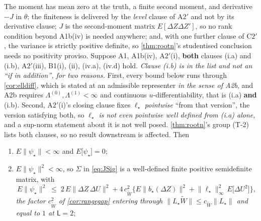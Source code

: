 \begin{lemma}[{The moment is valid, its variance is finite, its $\theta$-Jacobian is $-J$, and $J=E[\Delta Z\Delta Z']$}]\label{lem:momzero}
The moment has mean zero at the truth, a finite second moment, and derivative $-J$ in $\theta$; the
finiteness is delivered by the \emph{level} clause of A$2'$ and not by its derivative clause; $J$ is
the second-moment matrix $E[\Delta Z\Delta Z']$, so no rank condition beyond A1b(iv) is needed anywhere;
and, with one further clause of C$2'$, the variance is strictly positive definite, so \cref{thm:rootn}'s
studentised conclusion needs no positivity proviso.
Suppose A1, A1b(iv), A$2'$(i), \textbf{both} clauses (i.a) and (i.b), A$2'$(iii), B1(i), (ii),
(iv.a), (iv.d) hold. \emph{Clause \textup{(i.b)} is in the list and not an ``if in
addition'', for two reasons.} First, every bound below runs through \cref{cor:elldiff}, which
is stated at an admissible representer \emph{in the sense of A2b}, and A2b requires
$\Lambda^{(0)},\Lambda^{(1)}<\infty$ and continuous $u$-differentiability, that is (i.a) \textbf{and} (i.b).
Second, A$2'$(i)'s closing clause fixes $\ell_\star$ \emph{pointwise} ``from that version'', the version
satisfying both, so \emph{$\ell_\star$ is not even pointwise well defined from \textup{(i.a)} alone}, and a
sup-norm statement about it is not well posed. \cref{thm:rootn}'s group (T-2) lists both clauses, so no
result downstream is affected. Then
\begin{enumerate}
\item[(i)] $E\|\psi_\star\|<\infty$ and $E\big[\psi_\star\big]=0$;
\item[(ii)] $E\|\psi_\star\|^{2}<\infty$, so $\Sigma$ in \eqref{eq:JSig} is a well-defined finite positive
semidefinite matrix, with
\[
E\|\psi_\star\|^{2}\;\le\;2\,E\big\|\Delta Z\,\Delta U\big\|^{2}
+4\,c_{\widetilde W}^{2}\Big\{E\big\|b_\star(\Delta Z)\big\|^{2}+\big\|\ell_\star\big\|_\infty^{2}\,E\big[\Delta U^{2}\big]\Big\} ,
\]
\emph{the factor $c_{\widetilde W}^{2}$ of \cref{cor:rangegap} entering through
$\|L_\star\widetilde W\|\le c_{\widetilde W}\|L_\star\|$ and equal to $1$ at $\mathsf L=2$};

\end{enumerate}
\end{lemma}
